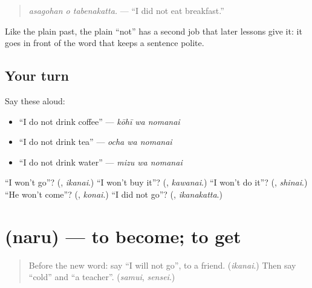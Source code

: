 \begin{quote}
\emph{asagohan o tabenakatta.} — \textquotedblleft{}I did not eat breakfast.\textquotedblright{}
\end{quote}

Like the plain past, the plain \textquotedblleft{}not\textquotedblright{} has a second job that later lessons give it: it goes in front of the word that keeps a sentence polite.

\subsection*{Your turn}
Say these aloud:

\begin{itemize}
\raggedright
  \item \textquotedblleft{}I do not drink coffee\textquotedblright{} — \emph{kōhī wa nomanai}
  \item \textquotedblleft{}I do not drink tea\textquotedblright{} — \emph{ocha wa nomanai}
  \item \textquotedblleft{}I do not drink water\textquotedblright{} — \emph{mizu wa nomanai}
\end{itemize}

\begin{tcolorbox}[breakable,colback=teal!4,colframe=teal!35!black,title={Before you move on}]
\textquotedblleft{}I won't go\textquotedblright{}? (\textbf{}, \emph{ikanai}.) \textquotedblleft{}I won't buy it\textquotedblright{}? (\textbf{}, \emph{kawanai}.) \textquotedblleft{}I won't do it\textquotedblright{}? (\textbf{}, \emph{shinai}.) \textquotedblleft{}He won't come\textquotedblright{}? (\textbf{}, \emph{konai}.) \textquotedblleft{}I did not go\textquotedblright{}? (\textbf{}, \emph{ikanakatta}.)
\end{tcolorbox}
\section[\texorpdfstring{\ja{なる} (naru)}{なる (naru)}]{ (naru) — to become; to get}

\label{lesson:JA-C251-naru}



\begin{quote}
Before the new word: say \textquotedblleft{}I will not go\textquotedblright{}, to a friend. (\emph{ikanai}.) Then say \textquotedblleft{}cold\textquotedblright{} and \textquotedblleft{}a teacher\textquotedblright{}. (\emph{samui}, \emph{sensei}.)
\end{quote}

